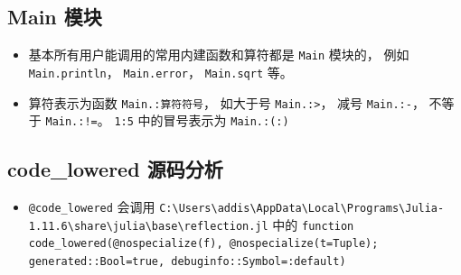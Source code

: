 \subsection{Main 模块}

\begin{itemize}
\item 基本所有用户能调用的常用内建函数和算符都是 \verb`Main` 模块的， 例如 \verb`Main.println`， \verb`Main.error`， \verb`Main.sqrt` 等。
\item 算符表示为函数 \verb`Main.:算符符号`， 如大于号 \verb`Main.:>`， 减号 \verb`Main.:-`， 不等于 \verb`Main.:!=`。 \verb`1:5` 中的冒号表示为 \verb`Main.:(:)`
\end{itemize}

\subsection{code_lowered 源码分析}
\begin{itemize}
\item \verb`@code_lowered` 会调用 \verb`C:\Users\addis\AppData\Local\Programs\Julia-1.11.6\share\julia\base\reflection.jl` 中的 \verb`function code_lowered(@nospecialize(f), @nospecialize(t=Tuple); generated::Bool=true, debuginfo::Symbol=:default)`
\end{itemize}
